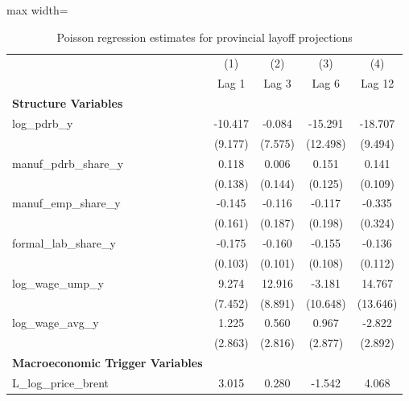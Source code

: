 \begin{table}[H]\centering
\caption{Poisson regression estimates for provincial layoff projections}
\small
\renewcommand{\arraystretch}{1.15}
\begin{adjustbox}{max width=\textwidth}
\begin{tabular}{l*{4}{c}}
\toprule
& (1) & (2) & (3) & (4) \\ & Lag 1 & Lag 3 & Lag 6 & Lag 12 \\ \midrule
\addlinespace\textbf{Structure Variables}&                     &                     &                     &                     \\
log\_pdrb\_y  &     -10.417         &      -0.084         &     -15.291         &     -18.707\sym{*}  \\
            &     (9.177)         &     (7.575)         &    (12.498)         &     (9.494)         \\
manuf\_pdrb\_share\_y&       0.118         &       0.006         &       0.151         &       0.141         \\
            &     (0.138)         &     (0.144)         &     (0.125)         &     (0.109)         \\
manuf\_emp\_share\_y&      -0.145         &      -0.116         &      -0.117         &      -0.335         \\
            &     (0.161)         &     (0.187)         &     (0.198)         &     (0.324)         \\
formal\_lab\_share\_y&      -0.175         &      -0.160         &      -0.155         &      -0.136         \\
            &     (0.103)         &     (0.101)         &     (0.108)         &     (0.112)         \\
log\_wage\_ump\_y&       9.274         &      12.916         &      -3.181         &      14.767         \\
            &     (7.452)         &     (8.891)         &    (10.648)         &    (13.646)         \\
log\_wage\_avg\_y&       1.225         &       0.560         &       0.967         &      -2.822         \\
            &     (2.863)         &     (2.816)         &     (2.877)         &     (2.892)         \\
\addlinespace\textbf{Macroeconomic Trigger Variables}&                     &                     &                     &                     \\
L\_log\_price\_brent&       3.015         &       0.280         &      -1.542         &       4.068\sym{***}\\

\end{tabular}
\end{adjustbox}
\end{table}
